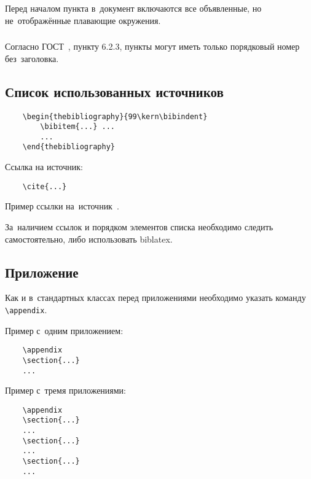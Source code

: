 \documentclass{mirea-prog-lang}
\begin{document}
Перед началом пункта в~документ включаются все объявленные, но не~отображённые плавающие окружения.

\subsubsection{}

Согласно ГОСТ~\cite{bib:gost732}, пункту 6.2.3, пункты могут иметь только порядковый номер без~заголовка.


\subsection{Список использованных источников}

\begin{verbatim}
	\begin{thebibliography}{99\kern\bibindent}
		\bibitem{...} ...
		...
	\end{thebibliography}
\end{verbatim}

Ссылка на источник:
\begin{verbatim}
	\cite{...}
\end{verbatim}

Пример ссылки на~источник~\cite{bib:recomendations}.

За~наличием ссылок и порядком элементов списка необходимо следить самостоятельно, либо использовать biblatex.


\subsection{Приложение}

Как и в~стандартных классах перед приложениями необходимо указать команду \verb"\appendix".

Пример с~одним приложением:
\begin{verbatim}
	\appendix
	\section{...}
	...
\end{verbatim}

Пример с~тремя приложениями:
\begin{verbatim}
	\appendix
	\section{...}
	...
	\section{...}
	...
	\section{...}
	...
\end{verbatim}
\end{document}
